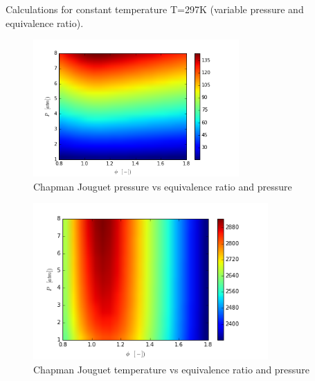 \documentclass[11pt,a4paper]{article}
\begin{document}
Calculations for constant temperature T=297K (variable pressure and equivalence ratio).\\
\begin{figure}[h]
    \centering
    \includegraphics[width=0.7\textwidth]{CJ_P_phi_P_}
    \caption{Chapman Jouguet pressure vs equivalence ratio and pressure}
    \label{fig:C}
\end{figure}
\clearpage
\begin{figure}[t]
    \centering
    \includegraphics[width=0.8\textwidth]{CJ_T_phi_P_}
    \caption{Chapman Jouguet temperature vs equivalence ratio and pressure}
    \label{fig:D}
\end{figure}
\end{document}
